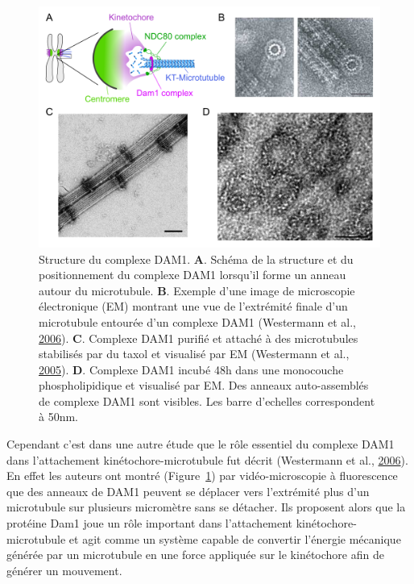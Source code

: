 \documentclass[12pt,a4paper,twoside,openright]{book}
\begin{document}
\begin{figure}[htbp]
\centering
\includegraphics{figures/intro/dam1-struct.png}
\caption[Structure du complexe DAM1]{\label{fig:dam1-struct}Structure du
complexe DAM1. \textbf{A}. Schéma de la structure et du positionnement
du complexe DAM1 lorsqu'il forme un anneau autour du microtubule.
\textbf{B}. Exemple d'une image de microscopie électronique (EM)
montrant une vue de l'extrémité finale d'un microtubule entourée d'un
complexe DAM1 (Westermann et al.,
\protect\hyperlink{ref-Westermann2006}{2006}). \textbf{C}. Complexe DAM1
purifié et attaché à des microtubules stabilisés par du taxol et
visualisé par EM (Westermann et al.,
\protect\hyperlink{ref-Westermann2005}{2005}). \textbf{D}. Complexe DAM1
incubé 48h dans une monocouche phospholipidique et visualisé par EM. Des
anneaux auto-assemblés de complexe DAM1 sont visibles. Les barre
d'echelles correspondent à 50nm.}
\end{figure}

Cependant c'est dans une autre étude que le rôle essentiel du complexe
DAM1 dans l'attachement kinétochore-microtubule fut décrit (Westermann
et al., \protect\hyperlink{ref-Westermann2006}{2006}). En effet les
auteurs ont montré (Figure~\ref{fig:dam1-struct}) par vidéo-microscopie
à fluorescence que des anneaux de DAM1 peuvent se déplacer vers
l'extrémité plus d'un microtubule sur plusieurs micromètre sans se
détacher. Ils proposent alors que la protéine Dam1 joue un rôle
important dans l'attachement kinétochore-microtubule et agit comme un
système capable de convertir l'énergie mécanique générée par un
microtubule en une force appliquée sur le kinétochore afin de générer un
mouvement.
\end{document}
